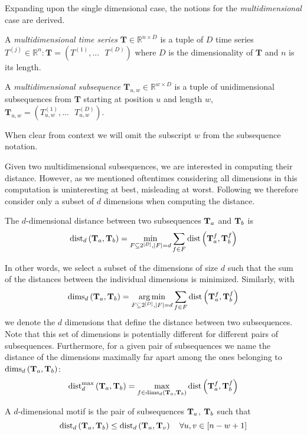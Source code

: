 Expanding upon the single dimensional case, the notions for the \textit{multidimensional} case are derived.
\begin{definition}
    \textup{A \textit{multidimensional time series} $\textbf{T}\in \mathbb{R}^{n\times D}$ is a tuple of $D$ time series $T^{(j)}\in \mathbb{R}^n : \textbf{T}=\left(T^{(1)},...\text{ }T^{(D)}\right)$ where $D$ is the dimensionality of $\textbf{T}$ and $n$ is its length.   
    }
\end{definition}
\begin{definition}
    \textup{A \textit{multidimensional subsequence} $\textbf{T}_{u,w}\in \mathbb{R}^{w\times D}$ is a tuple of unidimensional subsequences from $\textbf{T}$ starting at position $u$ and length $w$, $\textbf{T}_{u,w}=\left(T^{(1)}_{u,w},...\text{ }T^{(D)}_{u,w}\right)$.
    }
\end{definition}
When clear from context we will omit the subscript $w$ from the subsequence notation.


Given two multidimensional subsequences, we are interested in computing their distance.
However, as we mentioned oftentimes considering all dimensions in this computation is uninteresting at best, misleading at worst.
Following \cite{keoghMP} we therefore consider only a subset of $d$ dimensions
when computing the distance.


\begin{definition}
\label{def:distdims}
The $d$-dimensional distance between two subsequences $\mathbf{T}_{a}$ and $\mathbf{T}_{b}$
is
\[
\operatorname{dist}_{d}\left(\mathbf{T}_{a}, \mathbf{T}_{b}\right)
=
\min_{F \subseteq 2^{[D]}, |F| = d} \sum_{f \in F} \operatorname{dist}\left(\mathbf{T}_{a}^{f}, \mathbf{T}_{b}^{f}\right)
\]
\end{definition}
In other words, we select a subset of the dimensions of size $d$ such that the sum of the distances between the individual dimensions is minimized.
Similarly, with
\[
\operatorname{dims}_{d}\left(\mathbf{T}_{a}, \mathbf{T}_{b}\right)
=
\operatorname*{arg\,min}_{F \subseteq 2^{[D]}, |F| = d} \sum_{f \in F} \operatorname{dist}\left(\mathbf{T}_{a}^{f}, \mathbf{T}_{b}^{f}\right)
\]
we denote the $d$ dimensions that define the distance between two subsequences.
Note that this set of dimensions is potentially different for different pairs of subsequences.
Furthermore, for a given pair of subsequences we name the distance of the dimensions maximally far apart among the ones belonging to $\operatorname{dims}_{d}\left(\mathbf{T}_{a}, \mathbf{T}_{b}\right)$:
\begin{equation}\label{eq:distdmax}
\operatorname{dist}^{\max}_{d}\left(\mathbf{T}_{a}, \mathbf{T}_{b}\right) =
\max_{f \in \operatorname{dims}_{d}\left(\mathbf{T}_{a}, \mathbf{T}_{b}\right)}
\operatorname{dist}\left(
    \mathbf{T}_{a}^{f}, \mathbf{T}_{b}^{f}
\right)
\end{equation}


\begin{definition}
    \label{def:dist}
    A $d$-dimensional motif is the pair of subsequences $\mathbf{T}_{a}$, $\mathbf{T}_{b}$
    such that
    \[
        \operatorname{dist}_{d}\left(\mathbf{T}_{a}, \mathbf{T}_{b}\right)
        \le
        \operatorname{dist}_{d}\left(\mathbf{T}_{u}, \mathbf{T}_{v}\right)
        \quad
        \forall u, v \in [n-w+1]
    \]
\end{definition}

